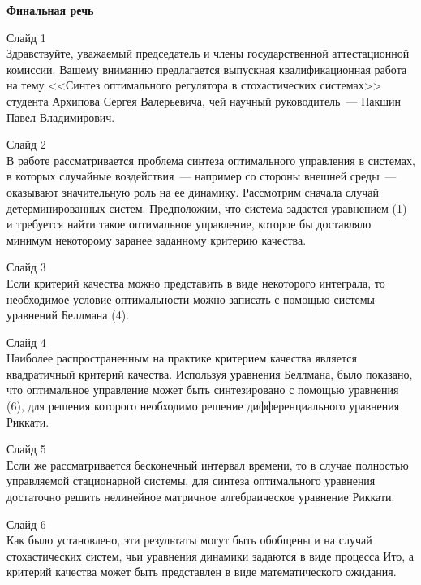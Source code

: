 \documentclass[12pt,a4paper,legalpaper,pdftex]{letter}
\begin{document}
\newcommand{\header}[1]{    \begin{center}{\fontsize{26pt}{26pt}\selectfont \textbf{#1}}\end{center}  }
\newcommand{\subheader}[1]{ \vspace{20pt} {\fontsize{16pt}{10pt}\selectfont Слайд #1} \vspace{8pt} \\ }



\pagestyle{empty}



\header{Финальная речь}



\subheader{1}
Здравствуйте, уважаемый председатель и члены государственной аттестационной комиссии. Вашему вниманию предлагается выпускная квалификационная ра­бота на тему <<Синтез оптимального регулятора в стохастических системах>> студента Архипова Сергея Валерьевича, чей научный руководитель~--- Пакшин Павел Владимирович.



\subheader{2}
В работе рассматривается проблема синтеза оптимального управления в системах, в которых случайные воздействия~--- например со стороны внешней среды~--- оказывают значительную роль на ее динамику. Рассмотрим сначала случай детерминированных систем. Предположим, что система задается уравнением (1) и требуется найти такое оптимальное управление, которое бы доставляло минимум некоторому заранее заданному критерию качества.



\subheader{3}
Если критерий качества можно представить в виде некоторого интеграла, то необходимое условие оптимальности можно записать с помощью системы уравнений Беллмана (4).



\subheader{4}
Наиболее распространенным на практике критерием качества является квадратичный критерий качества. Используя уравнения Беллмана, было показано, что оптимальное управление может быть синтезировано с помощью уравнения (6), для решения которого необходимо решение дифференциального уравнения Риккати.



\subheader{5}
Если же рассматривается бесконечный интервал времени, то в случае полностью управляемой стационарной системы, для синтеза оптимального уравнения достаточно решить нелинейное матричное алгебраическое уравнение Риккати.



\subheader{6}
Как было установлено, эти результаты могут быть обобщены и на случай стохастических систем, чьи уравнения динамики задаются в виде процесса Ито, а критерий качества может быть представлен в виде математического ожидания.
\end{document}
